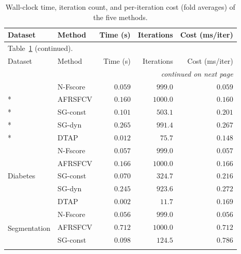 \documentclass[]{interact}
\theoremstyle{plain}
\theoremstyle{definition}
\theoremstyle{remark}
\begin{document}
{\footnotesize
\begin{longtable}{ll rrr}
\caption{Wall-clock time, iteration count, and per-iteration cost (fold averages)
of the five methods.}\label{tab:runtime} \\
\toprule
Dataset & Method & Time (s) & Iterations & Cost (ms/iter) \\
\midrule
\endfirsthead
\multicolumn{5}{l}{\footnotesize Table~\ref{tab:runtime} (continued).} \\
\toprule
Dataset & Method & Time (s) & Iterations & Cost (ms/iter) \\
\midrule
\endhead
\midrule
\multicolumn{5}{r}{\footnotesize\emph{continued on next page}} \\
\endfoot
\bottomrule
\endlastfoot
\multirow{5}{*}{Glass}        & N-Fscore & $0.059$          & $999.0$         & $\mathbf{0.059}$ \\*
                              & AFRSFCV  & $0.160$          & $1000.0$        & $0.160$          \\*
                              & SG-const & $0.101$          & $503.1$         & $0.201$          \\*
                              & SG-dyn   & $0.265$          & $991.4$         & $0.267$          \\*
                              & DTAP     & $\mathbf{0.012}$ & $\mathbf{75.7}$ & $0.148$          \\
\midrule
\multirow{5}{*}{Diabetes}     & N-Fscore & $0.057$          & $999.0$         & $\mathbf{0.057}$ \\*
                              & AFRSFCV  & $0.166$          & $1000.0$        & $0.166$          \\*
                              & SG-const & $0.070$          & $324.7$         & $0.216$          \\*
                              & SG-dyn   & $0.245$          & $923.6$         & $0.272$          \\*
                              & DTAP     & $\mathbf{0.002}$ & $\mathbf{11.7}$ & $0.169$          \\
\midrule
\multirow{5}{*}{Segmentation} & N-Fscore & $0.056$          & $999.0$         & $\mathbf{0.056}$ \\*
                              & AFRSFCV  & $0.712$          & $1000.0$        & $0.712$          \\*
                              & SG-const & $0.098$          & $124.5$         & $0.786$          \\*

\end{longtable}}
\end{document}
